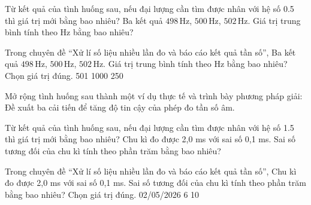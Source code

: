 \begin{ex}
Từ kết quả của tình huống sau, nếu đại lượng cần tìm được nhân với hệ số 0.5 thì giá trị mới bằng bao nhiêu? Ba kết quả $498\,\text{Hz}$, $500\,\text{Hz}$, $502\,\text{Hz}$. Giá trị trung bình tính theo Hz bằng bao nhiêu?
\end{ex}

\begin{ex}
Trong chuyên đề “Xử lí số liệu nhiều lần đo và báo cáo kết quả tần số”, Ba kết quả $498\,\text{Hz}$, $500\,\text{Hz}$, $502\,\text{Hz}$. Giá trị trung bình tính theo Hz bằng bao nhiêu? Chọn giá trị đúng.
\choice
{501}
{}
{1000}
{250}
\end{ex}

\begin{ex}
Mở rộng tình huống sau thành một ví dụ thực tế và trình bày phương pháp giải: Đề xuất ba cải tiến để tăng độ tin cậy của phép đo tần số âm.
\choiceTF

\end{ex}

\begin{ex}
Từ kết quả của tình huống sau, nếu đại lượng cần tìm được nhân với hệ số 1.5 thì giá trị mới bằng bao nhiêu? Chu kì đo được 2,0 ms với sai số 0,1 ms. Sai số tương đối của chu kì tính theo phần trăm bằng bao nhiêu?
\end{ex}

\begin{ex}
Trong chuyên đề “Xử lí số liệu nhiều lần đo và báo cáo kết quả tần số”, Chu kì đo được 2,0 ms với sai số 0,1 ms. Sai số tương đối của chu kì tính theo phần trăm bằng bao nhiêu? Chọn giá trị đúng.
\choice
{02/05/2026}
{6}
{}
{10}
\end{ex}

